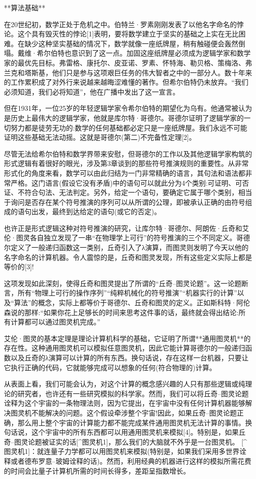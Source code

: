 **算法基础**

在20世纪初，数学正处于危机之中。伯特兰·罗素刚刚发表了以他名字命名的悖论。这个具有毁灭性的悖论[1]表明，要将数学建立于坚实的基础之上实在无比困难。在缺少这种坚实基础的情况下，数学就像一座纸牌屋，稍有触碰便会轰然倒塌。戴维·希尔伯特也意识到了这一点。加固这座纸牌屋必须成为逻辑学家和数学家的最优先目标。弗雷格、康托尔、皮亚诺、罗素、怀特海、勒贝格、策梅洛、弗兰克和塔斯基，他们只是参与这项艰巨任务的伟大智者之中的一部分人。数十年来的工作累积成了对外行来说越来越晦涩难懂的著作。但希尔伯特仍未放弃。“我们必须知道，我们必将知道”，他在广播中发出了这一宣言。

但在1931年，一位25岁的年轻逻辑学家令希尔伯特的期望化为乌有。他通常被认为是历史上最伟大的逻辑学家，他就是库尔特·哥德尔。哥德尔证明了逻辑学家的一切努力都是徒劳无功的:数学的任何基础都必定只是一座纸牌屋。我们永远不可能证明这些基础无法动摇。这就是哥德尔(第二)不完备性定理[2]。

尽管无法给希尔伯特和数学界带来安慰，但哥德尔的工作以及其他逻辑学家构筑的形式逻辑有着很好的眼光，涉及第3章谈到的那些符号推演规则的重要性。从非常形式化的角度来看，数学可以由此归结为一门非常精确的语言，其句法和语法都非常严格。这门语言(假设它没有矛盾)中的语句可以就此分为4个类别:可证明、可否证、不符合句法、无法判定。另外，给定一个语句，要确定它属于哪个类别，相当于询问是否存在某个符号推演的序列可以从所谓的公理，即被承认正确的由符号组成的语句出发，最终到达给定的语句(或它的否定)。

也许正是形式逻辑这种对符号推演的研究，让库尔特·哥德尔、阿朗佐·丘奇和艾伦·图灵各自独立发现了一串“在物理学上可行”的符号推演的三个不同定义。哥德尔定义了一般递归函数这一类别，丘奇引入了λ演算，而图灵则发明了今天以他的名字命名的计算机器。令人震惊的是，丘奇和图灵发现，所有这些定义实际上都是等价的[3]!

这项发现如此深刻，使得丘奇和图灵提出了所谓的“丘奇–图灵论题”。这一论题断言，所有“物理上可行的操作序列”“纯粹机械化的符号推演”“机器实行的计算”以及“算法”的概念，实际上都等价于哥德尔、丘奇和图灵的定义。正如斯科特·阿伦森说的那样:“如果你花上足够长的时间来思考这件事的话，最终就会得出结论:所有计算都可以通过图灵机完成。”

艾伦·图灵的基本定理是理论计算机科学的基础，它证明了所谓**通用图灵机**的存在性。这种通用图灵机可以模拟任意图灵机，因此它能计算哥德尔的一般递归函数以及丘奇的λ演算可以计算的所有东西。换句话说，存在这样一台机器，只要让它执行正确的代码，它就能够完成可以想象的任何(符合物理的)计算。

从表面上看，我们可能会认为，对这个计算的概念感兴趣的人只有那些逻辑或纯理论的研究者，也许还有一些研究模拟的科学家。然而，我们可以将丘奇–图灵论题诠释为这个宇宙的一条物理法则，因为它提出，在宇宙中没有任何计算机器能够解决图灵机不能解决的问题。这个假设牵涉整个宇宙!因此，如果丘奇–图灵论题正确，那么用上整个宇宙的计算能力都不能完成某件通用图灵机无法计算的事情。换句话说，这个宇宙中的所有东西都可以用通用图灵机来模拟[4]。特别是，如果丘奇–图灵论题被证实的话[^图灵机1]，那么我们的大脑就不外乎是一台图灵机。
[^图灵机1]：就连量子力学都可以用图灵机来模拟(特别是，如果我们采用多世界诠释或者德布罗意–玻姆诠释的话)。然而，利用经典的机器进行这样的模拟所需花费的时间会比量子计算机所需的时间长得多，差距呈指数增长。

